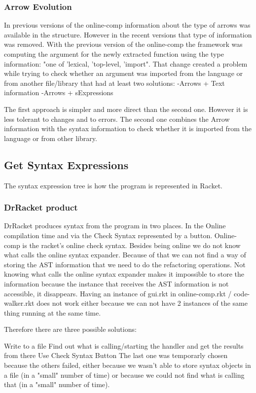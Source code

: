 \subsubsection{Arrow Evolution}
In previous versions of the online-comp information about the type of arrows
was available in the structure. However in the recent versions that type of
information was removed.
With the previous version of the online-comp the framework was computing the argument for the
newly extracted function using the type information: "one of 'lexical, 'top-level, 'import".
That change created a problem while trying to check whether an argument was imported
from the language or from another file/library that had at least two solutions:
  -Arrows + Text information
  -Arrows + sExpressions

The first approach is simpler and more direct than the second one. However it is
less tolerant to changes and to errors.
The second one combines the Arrow information with the syntax information to
check whether it is imported from the language or from other library.


\subsection{Get Syntax Expressions}
The syntax expression tree is how the program is represented in Racket.

\subsubsection{DrRacket product}
DrRacket produces syntax from the program in two places.
In the Online compilation time and via the Check Syntax represented by a button.
Online-comp is the racket's online check syntax.
Besides being online we do not know what calls the online syntax expander.
Because of that we can not find a way of storing the AST information that we
need to do the refactoring operations.
Not knowing what calls the online syntax expander makes it impossible to store
the information because the instance that receives the AST information is not
accessible, it disappears.
Having an instance of gui.rkt in
online-comp.rkt / code-walker.rkt does not work either because we can not have 2
instances of the same thing running at the same time.


Therefore there are three possible solutions:

Write to a file
Find out what is calling/starting the handler and get the results from there
Use Check Syntax Button
The last one was temporarly chosen because the others failed, either because we wasn't able
 to store syntax objects in a file (in a "small" number of time) or because we
 could not find what is calling that (in a "small" number of time).

